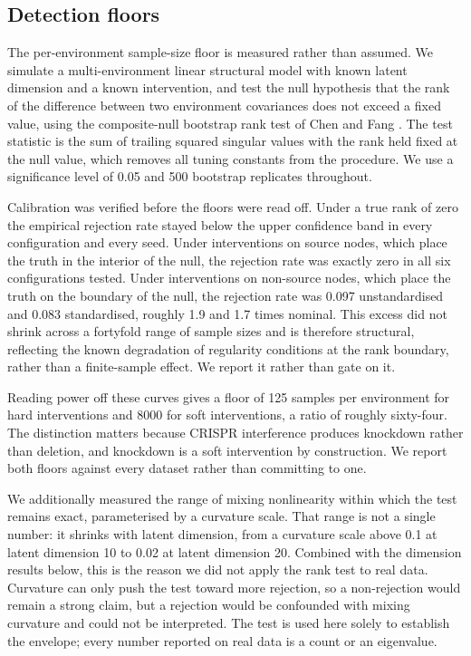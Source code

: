 \documentclass[journal,twoside,web]{ieeecolor}
\begin{document}
\subsection{Detection floors}
\label{sec:floors}
The per-environment sample-size floor is measured rather than assumed. We
simulate a multi-environment linear structural model with known latent
dimension and a known intervention, and test the null hypothesis that the rank
of the difference between two environment covariances does not exceed a fixed
value, using the composite-null bootstrap rank test of Chen and Fang
\cite{chen2019}. The test statistic is the sum of trailing squared singular
values with the rank held fixed at the null value, which removes all tuning
constants from the procedure. We use a significance level of 0.05 and 500
bootstrap replicates throughout.

Calibration was verified before the floors were read off. Under a true rank of
zero the empirical rejection rate stayed below the upper confidence band in
every configuration and every seed. Under interventions on source nodes, which
place the truth in the interior of the null, the rejection rate was exactly
zero in all six configurations tested. Under interventions on non-source
nodes, which place the truth on the boundary of the null, the rejection rate
was 0.097 unstandardised and 0.083 standardised, roughly 1.9 and 1.7 times
nominal. This excess did not shrink across a fortyfold range of sample sizes
and is therefore structural, reflecting the known degradation of regularity
conditions at the rank boundary, rather than a finite-sample effect. We report
it rather than gate on it.

Reading power off these curves gives a floor of 125 samples per environment
for hard interventions and 8000 for soft interventions, a ratio of roughly
sixty-four. The distinction matters because CRISPR interference produces
knockdown rather than deletion, and knockdown is a soft intervention by
construction. We report both floors against every dataset rather than
committing to one.

We additionally measured the range of mixing nonlinearity within which the
test remains exact, parameterised by a curvature scale. That range is not a
single number: it shrinks with latent dimension, from a curvature scale above
0.1 at latent dimension 10 to 0.02 at latent dimension 20. Combined with the
dimension results below, this is the reason we did not apply the rank test to
real data. Curvature can only push the test toward more rejection, so a
non-rejection would remain a strong claim, but a rejection would be confounded
with mixing curvature and could not be interpreted. The test is used here
solely to establish the envelope; every number reported on real data is a
count or an eigenvalue.
\end{document}
